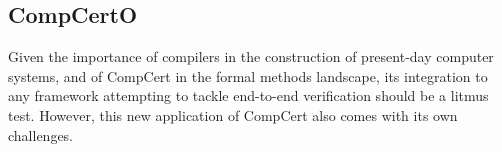 \documentclass[draft,11pt]{report}
\begin{document}


\subsection{CompCertO} %

Given the importance of compilers in
the construction of present-day computer systems,
and of CompCert in the formal methods landscape,
its integration to any framework
attempting to tackle end-to-end verification
should be a litmus test.
However, this new application of CompCert also
comes with its own challenges.
\end{document}
